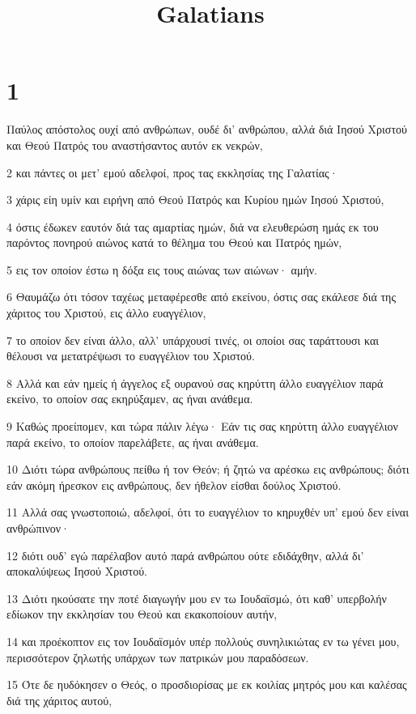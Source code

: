 

\title{Galatians}


\chapter{1}

\par Παύλος απόστολος ουχί από ανθρώπων, ουδέ δι' ανθρώπου, αλλά διά Ιησού Χριστού και Θεού Πατρός του αναστήσαντος αυτόν εκ νεκρών,
\par 2 και πάντες οι μετ' εμού αδελφοί, προς τας εκκλησίας της Γαλατίας·
\par 3 χάρις είη υμίν και ειρήνη από Θεού Πατρός και Κυρίου ημών Ιησού Χριστού,
\par 4 όστις έδωκεν εαυτόν διά τας αμαρτίας ημών, διά να ελευθερώση ημάς εκ του παρόντος πονηρού αιώνος κατά το θέλημα του Θεού και Πατρός ημών,
\par 5 εις τον οποίον έστω η δόξα εις τους αιώνας των αιώνων· αμήν.
\par 6 Θαυμάζω ότι τόσον ταχέως μεταφέρεσθε από εκείνου, όστις σας εκάλεσε διά της χάριτος του Χριστού, εις άλλο ευαγγέλιον,
\par 7 το οποίον δεν είναι άλλο, αλλ' υπάρχουσί τινές, οι οποίοι σας ταράττουσι και θέλουσι να μετατρέψωσι το ευαγγέλιον του Χριστού.
\par 8 Αλλά και εάν ημείς ή άγγελος εξ ουρανού σας κηρύττη άλλο ευαγγέλιον παρά εκείνο, το οποίον σας εκηρύξαμεν, ας ήναι ανάθεμα.
\par 9 Καθώς προείπομεν, και τώρα πάλιν λέγω· Εάν τις σας κηρύττη άλλο ευαγγέλιον παρά εκείνο, το οποίον παρελάβετε, ας ήναι ανάθεμα.
\par 10 Διότι τώρα ανθρώπους πείθω ή τον Θεόν; ή ζητώ να αρέσκω εις ανθρώπους; διότι εάν ακόμη ήρεσκον εις ανθρώπους, δεν ήθελον είσθαι δούλος Χριστού.
\par 11 Αλλά σας γνωστοποιώ, αδελφοί, ότι το ευαγγέλιον το κηρυχθέν υπ' εμού δεν είναι ανθρώπινον·
\par 12 διότι ουδ' εγώ παρέλαβον αυτό παρά ανθρώπου ούτε εδιδάχθην, αλλά δι' αποκαλύψεως Ιησού Χριστού.
\par 13 Διότι ηκούσατε την ποτέ διαγωγήν μου εν τω Ιουδαϊσμώ, ότι καθ' υπερβολήν εδίωκον την εκκλησίαν του Θεού και εκακοποίουν αυτήν,
\par 14 και προέκοπτον εις τον Ιουδαϊσμόν υπέρ πολλούς συνηλικιώτας εν τω γένει μου, περισσότερον ζηλωτής υπάρχων των πατρικών μου παραδόσεων.
\par 15 Ότε δε ηυδόκησεν ο Θεός, ο προσδιορίσας με εκ κοιλίας μητρός μου και καλέσας διά της χάριτος αυτού,
